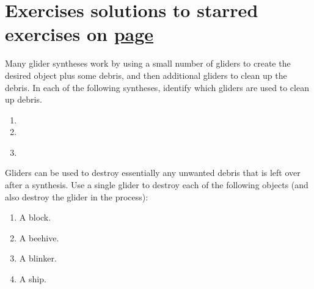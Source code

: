 \section*{Exercises \hfill \normalfont\textsf{\small solutions to starred exercises on \hyperlink{solutions_glider_synthesis}{page \pageref{solutions_glider_synthesis}}}}
\label{sec:synthesis_exercises}
\vspace*{-0.4cm}\hrulefill\vspace*{-0.3cm}\footnotesize\begin{multicols}{2}\vspace*{-0.4cm}\raggedcolumns{}
	\setlength{\parskip}{0pt}
	
	\begin{problemstar}\label{exer:glider_cleanup}
		Many glider syntheses work by using a small number of gliders to create the desired object plus some debris, and then additional gliders to clean up the debris. In each of the following syntheses, identify which gliders are used to clean up debris.
		\begin{enumerate}[label=\bf\color{ocre}(\alph*)]
			\item {}
			\item {}
			\item {}\\
		\end{enumerate}
	\end{problemstar}
	
	
	\mfilbreak
	
	
	\begin{problem}\label{exer:single_glider_cleanup}
		Gliders can be used to destroy essentially any unwanted debris that is left over after a synthesis. Use a single glider to destroy each of the following objects (and also destroy the glider in the process):
		\begin{enumerate}[label=\bf\color{ocre}(\alph*)]
			\item A block.
			
			\item A beehive.
			
			\item A blinker.
			
			\item A ship.
			

\end{enumerate}
\end{problem}
\end{multicols}
